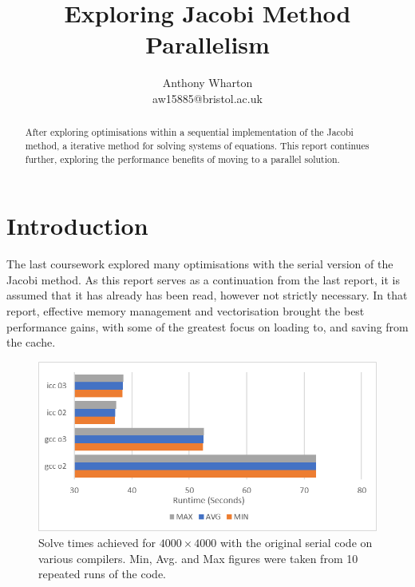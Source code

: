 \documentclass[11pt,twocolumn,a4paper]{article}
\begin{document}
\title{\LARGE\bfseries Exploring Jacobi Method Parallelism}
\date{\vspace{-1cm}} %
\author{Anthony Wharton \\ aw15885@bristol.ac.uk}
\maketitle

\begin{abstract}
After exploring optimisations within a sequential implementation of the Jacobi method, a iterative method for solving systems of equations. This report continues further, exploring the performance benefits of moving to a parallel solution.
\end{abstract}


\section{Introduction}
The last coursework explored many optimisations with the serial version of the Jacobi method. As this report serves as a continuation from the last report, it is assumed that it has already has been read, however not strictly necessary. In that report, effective memory management and vectorisation brought the best performance gains, with some of the greatest focus on loading to, and saving from the cache. \par

\begin{figure}[h]
        \centering
        \includegraphics[width=0.8\linewidth]{figures/1-SEQ.png}
        \caption{Solve times achieved for $4000\times4000$ with the original serial code on various compilers. Min, Avg. and Max figures were taken from 10 repeated runs of the code.}
        \label{fig-1-seq}
\end{figure}
\end{document}
